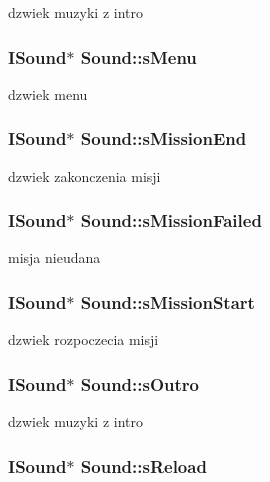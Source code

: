 \label{class_sound_a0dde397779cc020d93c28aa98b2ba942}
dzwiek muzyki z intro \hypertarget{class_sound_a5fdb025b096d4b60089b00143cc9d7c8}{
\subsubsection[{sMenu}]{\setlength{\rightskip}{0pt plus 5cm}ISound$\ast$ {\bf Sound::sMenu}}}
\label{class_sound_a5fdb025b096d4b60089b00143cc9d7c8}
dzwiek menu \hypertarget{class_sound_a6fc954df665a4b57821cd8aa45a1744b}{
\subsubsection[{sMissionEnd}]{\setlength{\rightskip}{0pt plus 5cm}ISound$\ast$ {\bf Sound::sMissionEnd}}}
\label{class_sound_a6fc954df665a4b57821cd8aa45a1744b}
dzwiek zakonczenia misji \hypertarget{class_sound_a75fa0bcfedb84fd8aadfaf5345aa2927}{
\subsubsection[{sMissionFailed}]{\setlength{\rightskip}{0pt plus 5cm}ISound$\ast$ {\bf Sound::sMissionFailed}}}
\label{class_sound_a75fa0bcfedb84fd8aadfaf5345aa2927}
misja nieudana \hypertarget{class_sound_a77b47c9d823199006247f6170be5fe16}{
\subsubsection[{sMissionStart}]{\setlength{\rightskip}{0pt plus 5cm}ISound$\ast$ {\bf Sound::sMissionStart}}}
\label{class_sound_a77b47c9d823199006247f6170be5fe16}
dzwiek rozpoczecia misji \hypertarget{class_sound_ace8a859201daf162e878975fc224202f}{
\subsubsection[{sOutro}]{\setlength{\rightskip}{0pt plus 5cm}ISound$\ast$ {\bf Sound::sOutro}}}
\label{class_sound_ace8a859201daf162e878975fc224202f}
dzwiek muzyki z intro \hypertarget{class_sound_af7bd98fddb7793a24c3159a77df5ee08}{
\subsubsection[{sReload}]{\setlength{\rightskip}{0pt plus 5cm}ISound$\ast$ {\bf Sound::sReload}}}
